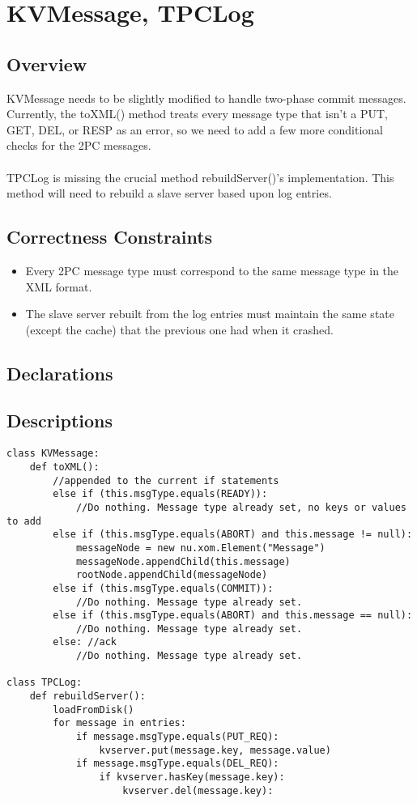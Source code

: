 \section{KVMessage, TPCLog}
\subsection{Overview}
KVMessage needs to be slightly modified to handle two-phase commit messages. Currently, the toXML() method treats every message type that isn't a PUT, GET, DEL, or RESP as an error, so we need to add a few more conditional checks for the 2PC messages.\\\\
TPCLog is missing the crucial method rebuildServer()'s implementation. This method will need to rebuild a slave server based upon log entries.
\subsection{Correctness Constraints}
\begin{itemize}
\item Every 2PC message type must correspond to the same message type in the XML format.
\item The slave server rebuilt from the log entries must maintain the same state (except the cache) that the previous one had when it crashed.
\end{itemize}
\subsection{Declarations}

\subsection{Descriptions}
\begin{verbatim}
class KVMessage:
    def toXML():
        //appended to the current if statements
        else if (this.msgType.equals(READY)):
            //Do nothing. Message type already set, no keys or values to add
        else if (this.msgType.equals(ABORT) and this.message != null):
            messageNode = new nu.xom.Element("Message")
            messageNode.appendChild(this.message)
            rootNode.appendChild(messageNode)
        else if (this.msgType.equals(COMMIT)):
            //Do nothing. Message type already set.
        else if (this.msgType.equals(ABORT) and this.message == null):
            //Do nothing. Message type already set.
        else: //ack
            //Do nothing. Message type already set.

class TPCLog:
    def rebuildServer():
        loadFromDisk()
        for message in entries:
            if message.msgType.equals(PUT_REQ):
                kvserver.put(message.key, message.value)
            if message.msgType.equals(DEL_REQ):
                if kvserver.hasKey(message.key):
                    kvserver.del(message.key):
        
\end{verbatim}
